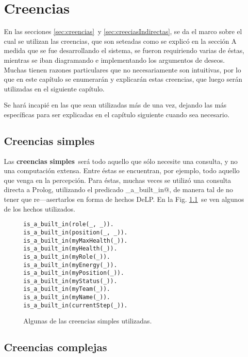 \documentclass[oneside]{book}
\begin{document}


\chapter{Creencias}

En las secciones \ref{sec:creencias}\ y \ref{sec:creeciasIndirectas}, se da el marco
sobre el cual se utilizan las creencias, que son seteadas como se explicó en la sección
A medida que se fue desarrollando el sistema, se fueron requiriendo varias de éstas,
mientras se iban diagramando e implementando los argumentos de deseos. Muchas tienen
razones particulares que no necesariamente son intuitivas, por lo que en este capítulo
se enumerarán y explicarán estas creencias, que luego serán utilizadas en el siguiente
capítulo.

Se hará incapié en las que sean utilizadas más de una vez, dejando las más específicas
para ser explicadas en el capítulo siguiente cuando sea necesario.


\section{Creencias simples}

Las \textbf{creencias simples}\ será todo aquello que sólo necesite una consulta, y no
una computación extensa. Entre éstas se encuentran, por ejemplo, todo aquello que venga
en la percepción. Para éstas, muchas veces se utilizó una consulta directa a Prolog,
utilizando el predicado \verb@s_a_built_in@, de manera tal de no tener que 
re---asertarlos en forma de hechos DeLP. En la Fig. \ref{fig:creenciasSimples}\ se ven
algunos de los hechos utilizados.

\begin{figure}
\begin{verbatim}
is_a_built_in(role(_, _)).
is_a_built_in(position(_, _)).
is_a_built_in(myMaxHealth(_)).
is_a_built_in(myHealth(_)).
is_a_built_in(myRole(_)).
is_a_built_in(myEnergy(_)).
is_a_built_in(myPosition(_)).
is_a_built_in(myStatus(_)).
is_a_built_in(myTeam(_)).
is_a_built_in(myName(_)).
is_a_built_in(currentStep(_)).
\end{verbatim}
\caption{Algunas de las creencias simples utilizadas.}
\label{fig:creenciasSimples}
\end{figure}


\section{Creencias complejas}
\end{document}
